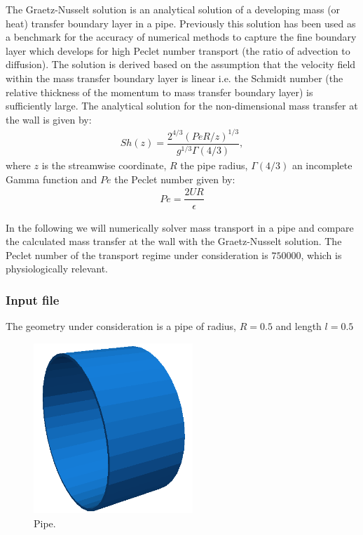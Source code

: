 The Graetz-Nusselt solution is an analytical solution of a developing mass (or
heat) transfer boundary layer in a pipe. Previously this solution has been used
as a benchmark for the accuracy of numerical methods to capture the fine
boundary layer which develops for high Peclet number transport (the ratio of
advection to diffusion). The solution is derived based on the assumption that
the velocity field within the mass transfer boundary layer is linear i.e. the
Schmidt number (the relative thickness of the momentum to mass transfer boundary
layer) is sufficiently large. The analytical solution for the non-dimensional
mass transfer at the wall is given by:
\begin{align*}
S h(z) = \dfrac{2^{4/3}(Pe R/z)^{1/3}}{g^{1/3}\Gamma(4/3)} , 
\end{align*}
where $z$ is the streamwise coordinate, $R$ the pipe radius, $\Gamma(4/3)$ an incomplete 
Gamma function and $Pe$ the Peclet number given by:
\begin{align*}
Pe = \dfrac{2 U R}{\epsilon}
\end{align*}

In the following we will numerically solver mass transport in a pipe and compare
the calculated mass transfer at the wall with the Graetz-Nusselt solution. The
Peclet number of the transport regime under consideration is $750000$, which is
physiologically relevant.

\subsubsection{Input file}
The geometry under consideration is a pipe of radius, $R = 0.5$ and length $l =
0.5$

\begin{figure}[h!]
\begin{center}
\includegraphics[width=6cm]{Figures/pipe}
\caption{Pipe.}
\end{center}
\end{figure}

